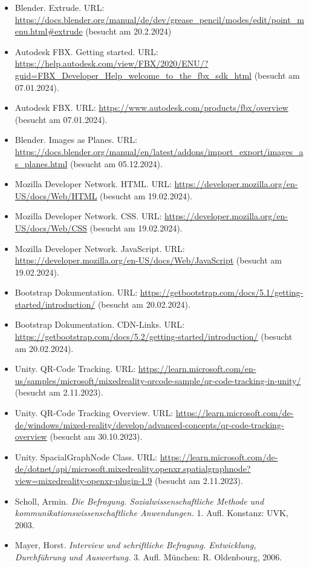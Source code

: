\begin{itemize}
    \item Blender. Extrude. URL: \url{https://docs.blender.org/manual/de/dev/grease_pencil/modes/edit/point_menu.html#extrude} (besucht am 20.2.2024)
    \item Autodesk FBX. Getting started. URL: \url{https://help.autodesk.com/view/FBX/2020/ENU/?guid=FBX_Developer_Help_welcome_to_the_fbx_sdk_html} (besucht am 07.01.2024).
    \item Autodesk FBX. URL: \url{https://www.autodesk.com/products/fbx/overview} (besucht am 07.01.2024).
    \item Blender. Images as Planes. URL: \url{https://docs.blender.org/manual/en/latest/addons/import_export/images_as_planes.html} (besucht am 05.12.2024).
    \item Mozilla Developer Network. HTML. URL: \url{https://developer.mozilla.org/en-US/docs/Web/HTML} (besucht am 19.02.2024).
    \item Mozilla Developer Network. CSS. URL: \url{https://developer.mozilla.org/en-US/docs/Web/CSS} (besucht am 19.02.2024).
    \item Mozilla Developer Network. JavaScript. URL: \url{https://developer.mozilla.org/en-US/docs/Web/JavaScript} (besucht am 19.02.2024).
    \item Bootstrap Dokumentation. URL: \url{https://getbootstrap.com/docs/5.1/getting-started/introduction/} (besucht am 20.02.2024).
    \item Bootstrap Dokumentation. CDN-Links. URL: \url{https://getbootstrap.com/docs/5.2/getting-started/introduction/} (besucht am 20.02.2024).
    \item Unity. QR-Code Tracking. URL: \url{https://learn.microsoft.com/en-us/samples/microsoft/mixedreality-qrcode-sample/qr-code-tracking-in-unity/} (besucht am 2.11.2023).
    \item Unity. QR-Code Tracking Overview. URL: \url{https://learn.microsoft.com/de-de/windows/mixed-reality/develop/advanced-concepts/qr-code-tracking-overview} (besucht am 30.10.2023).
    \item Unity. SpacialGraphNode Class. URL: \url{https://learn.microsoft.com/de-de/dotnet/api/microsoft.mixedreality.openxr.spatialgraphnode?view=mixedreality-openxr-plugin-1.9} (besucht am 2.11.2023).
    \item Scholl, Armin. \textit{Die Befragung. Sozialwissenschaftliche Methode und kommunikationswissenschaftliche Anwendungen.} 1. Aufl. Konstanz: UVK, 2003.
    \item Mayer, Horst. \textit{Interview und schriftliche Befragung. Entwicklung, Durchführung und Auswertung.} 3. Aufl. München: R. Oldenbourg, 2006.

\end{itemize}
